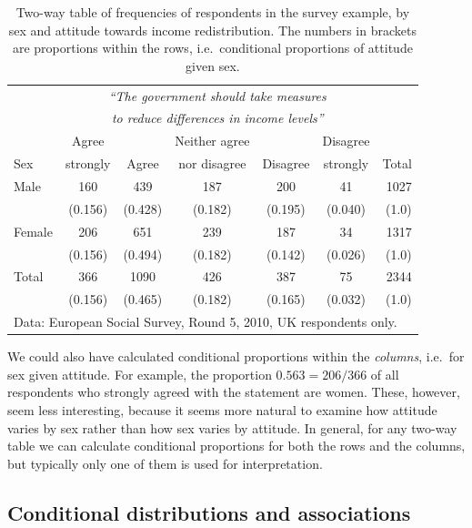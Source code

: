 \begin{table}
\caption{Two-way table of frequencies of respondents in the survey example,
by sex and attitude towards income redistribution. The numbers in
brackets are proportions within the rows, i.e.\ conditional proportions
of attitude given sex.}
\label{t_sex_attitude_row}
\begin{center}
\begin{tabular}{|l|ccccc|r|}\hline
& \multicolumn{5}{|c|}{\emph{``The government should
take measures}} & \\
& \multicolumn{5}{|c|}{\emph{to reduce differences in income levels''}}
& \\[.3ex]
 & Agree & & Neither agree & & Disagree & \\
Sex & strongly & Agree & nor disagree & Disagree & strongly & Total \\ \hline
Male &  160& 439 & 187 &200  & 41 & 1027 \\
& (0.156) & (0.428) & (0.182) & (0.195) & (0.040) & (1.0) \\
Female & 206 & 651 & 239 & 187 & 34 & 1317\\
& (0.156) & (0.494) & (0.182) & (0.142) & (0.026) & (1.0) \\
\hline
Total & 366 & 1090 & 426 & 387 & 75 & 2344 \\
 & (0.156) & (0.465) & (0.182) & (0.165)& (0.032) & (1.0) \\
\hline
\multicolumn{7}{l}{\scriptsize Data: European Social Survey, Round 5,
2010, UK respondents only.}
\end{tabular}
\end{center}
\vspace*{-3ex}
\end{table}

We could also have calculated conditional proportions within the
\emph{columns}, i.e.\ for sex given attitude. For example, the
proportion $0.563=206/366$ of all respondents who strongly agreed with
the statement are women. These, however, seem less interesting, because
it seems more natural to examine
how attitude varies by sex rather than how sex varies by attitude. In
general, for any two-way table we can calculate conditional proportions
for both the rows and the columns, but typically only one of them is
used for interpretation.

\subsection{Conditional distributions and associations}
\label{ss_descr1_2cat_assoc}

